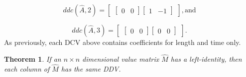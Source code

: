 \documentclass[10pt,letterpaper]{article}
\newtheorem{thm}{Theorem}[section]
\numberwithin{equation}{section}
\begin{document}
\[ ddc(\hat A, 2) = \left[ \begin{matrix} \left[ \begin{matrix} 0 &
        0 \end{matrix} \right] \left[ \begin{matrix} 1 &
        -1 \end{matrix} \right] \end{matrix} \right] , \mbox{and} \]

\[ ddc(\hat A, 3) = \left[ \begin{matrix} \left[ \begin{matrix} 0 &
        0 \end{matrix} \right] \left[ \begin{matrix} 0 &
        0 \end{matrix} \right] \end{matrix} \right] . \] As
previously, each DCV above contains coefficients for length and time
only.

\begin{thm} \label{if_IL_then_same_col_ddvs} If an $n \times n$
  dimensional value matrix $\hat M$ has a left-identity, then each
  column of $\hat M$ has the same DDV.\end{thm}
\end{document}
